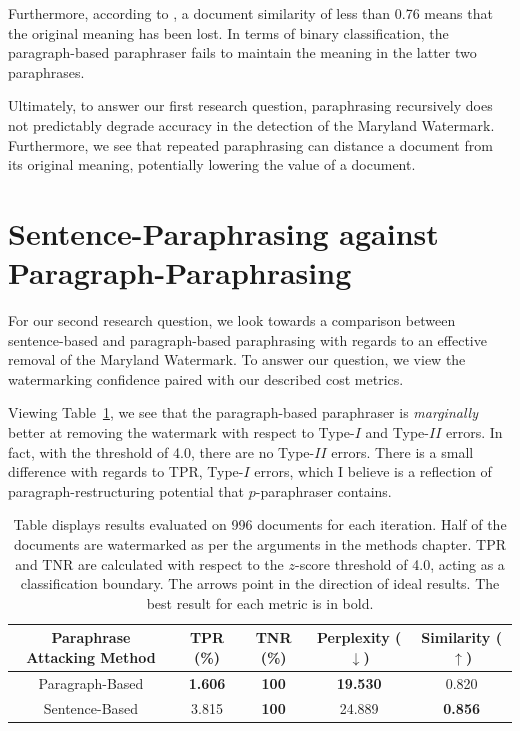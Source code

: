 \documentclass{l4proj}
\theoremstyle{definition}
\begin{document}
    Furthermore, according to \citet{krishna2023paraphrasing}, a document similarity of less than 0.76 means that the original meaning has been lost. In terms of binary classification, the paragraph-based paraphraser fails to maintain the meaning in the latter two paraphrases.

    Ultimately, to answer our first research question, paraphrasing recursively does not predictably degrade accuracy in the detection of the Maryland Watermark. Furthermore, we see that repeated paraphrasing can distance a document from its original meaning, potentially lowering the value of a document.
    
\section{Sentence-Paraphrasing against Paragraph-Paraphrasing}
    \label{sec:sentence-against-paragraph}
    For our second research question, we look towards a comparison between sentence-based and paragraph-based paraphrasing with regards to an effective removal of the Maryland Watermark. To answer our question, we view the watermarking confidence paired with our described cost metrics. 

    Viewing Table~\ref{table:sentence-against-paragraph-comparison}, we see that the paragraph-based paraphraser is \emph{marginally} better at removing the watermark with respect to Type-$I$ and Type-$II$ errors. In fact, with the \citet{kirchenbauer2023watermark} threshold of 4.0, there are no Type-$II$ errors. There is a small difference with regards to TPR, Type-$I$ errors, which I believe is a reflection of paragraph-restructuring potential that $p$-paraphraser contains.

    \begin{table}[ht]
        \centering
        \begin{tabular}{c|c|c|c|c}
            Paraphrase Attacking Method & TPR (\%) & TNR (\%) & Perplexity ($\downarrow$) & Similarity ($\uparrow$) \\ \hline
            Paragraph-Based & \textbf{1.606} & \textbf{100} & \textbf{19.530} & 0.820 \\
            Sentence-Based & 3.815 & \textbf{100} & 24.889 & \textbf{0.856}
        \end{tabular}
        \caption{Table displays results evaluated on 996 documents for each iteration. Half of the documents are watermarked as per the arguments in the methods chapter. TPR and TNR are calculated with respect to the $z$-score threshold of 4.0, acting as a classification boundary. The arrows point in the direction of ideal results. The best result for each metric is in bold.}
        \label{table:sentence-against-paragraph-comparison}
    \end{table}
\end{document}
